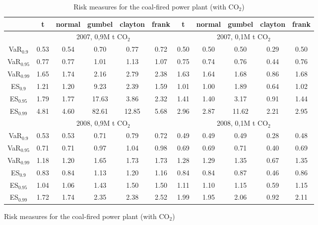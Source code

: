 \begin{figure}[htp]
{\tiny{}}
\begin{table}[!ht]
\centering{}{\tiny{}}%
\begin{tabular}{c|c|c|c|c|c|c|c|c|c|c}
 & {\tiny{t}} & {\tiny{normal}} & {\tiny{gumbel}} & {\tiny{clayton}} & {\tiny{frank}} & {\tiny{t}} & {\tiny{normal}} & {\tiny{gumbel}} & {\tiny{clayton}} & {\tiny{frank}}\tabularnewline
\hline 
 & \multicolumn{5}{c||}{{\tiny{2007, 0,9M t CO$_{2}$}}} & \multicolumn{5}{c}{{\tiny{2007, 0,1M t CO$_{2}$}}}\tabularnewline
\hline 
{\tiny{VaR$_{0.9}$}} & {\tiny{0.53}} & {\tiny{0.54}} & {\tiny{0.70}} & {\tiny{0.77}} & {\tiny{0.72}} & {\tiny{0.50}} & {\tiny{0.50}} & {\tiny{0.50}} & {\tiny{0.29}} & {\tiny{0.50}}\tabularnewline
{\tiny{VaR$_{0.95}$}} & {\tiny{0.77}} & {\tiny{0.77}} & {\tiny{1.01}} & {\tiny{1.13}} & {\tiny{1.07}} & {\tiny{0.75}} & {\tiny{0.74}} & {\tiny{0.76}} & {\tiny{0.44}} & {\tiny{0.76}}\tabularnewline
{\tiny{VaR$_{0.99}$}} & {\tiny{1.65}} & {\tiny{1.74}} & {\tiny{2.16}} & {\tiny{2.79}} & {\tiny{2.38}} & {\tiny{1.63}} & {\tiny{1.64}} & {\tiny{1.68}} & {\tiny{0.86}} & {\tiny{1.68}}\tabularnewline
{\tiny{ES$_{0.9}$}} & {\tiny{1.21}} & {\tiny{1.20}} & {\tiny{9.23}} & {\tiny{2.39}} & {\tiny{1.59}} & {\tiny{1.01}} & {\tiny{1.00}} & {\tiny{1.89}} & {\tiny{0.64}} & {\tiny{1.02}}\tabularnewline
{\tiny{ES$_{0.95}$}} & {\tiny{1.79}} & {\tiny{1.77}} & {\tiny{17.63}} & {\tiny{3.86}} & {\tiny{2.32}} & {\tiny{1.41}} & {\tiny{1.40}} & {\tiny{3.17}} & {\tiny{0.91}} & {\tiny{1.44}}\tabularnewline
{\tiny{ES$_{0.99}$}} & {\tiny{4.81}} & {\tiny{4.60}} & {\tiny{82.61}} & {\tiny{12.85}} & {\tiny{5.68}} & {\tiny{2.96}} & {\tiny{2.87}} & {\tiny{11.62}} & {\tiny{2.21}} & {\tiny{2.95}}\tabularnewline
\hline 
 & \multicolumn{5}{c||}{{\tiny{2008, 0,9M t CO$_{2}$}}} & \multicolumn{5}{c}{{\tiny{2008, 0,1M t CO$_{2}$}}}\tabularnewline
\hline 
{\tiny{VaR$_{0.9}$}} & {\tiny{0.53}} & {\tiny{0.53}} & {\tiny{0.71}} & {\tiny{0.79}} & {\tiny{0.72}} & {\tiny{0.49}} & {\tiny{0.49}} & {\tiny{0.49}} & {\tiny{0.28}} & {\tiny{0.48}}\tabularnewline
{\tiny{VaR$_{0.95}$}} & {\tiny{0.71}} & {\tiny{0.71}} & {\tiny{0.97}} & {\tiny{1.04}} & {\tiny{0.98}} & {\tiny{0.69}} & {\tiny{0.69}} & {\tiny{0.71}} & {\tiny{0.40}} & {\tiny{0.69}}\tabularnewline
{\tiny{VaR$_{0.99}$}} & {\tiny{1.18}} & {\tiny{1.20}} & {\tiny{1.65}} & {\tiny{1.73}} & {\tiny{1.73}} & {\tiny{1.28}} & {\tiny{1.29}} & {\tiny{1.35}} & {\tiny{0.67}} & {\tiny{1.35}}\tabularnewline
{\tiny{ES$_{0.9}$}} & {\tiny{0.83}} & {\tiny{0.84}} & {\tiny{1.13}} & {\tiny{1.20}} & {\tiny{1.16}} & {\tiny{0.84}} & {\tiny{0.84}} & {\tiny{0.87}} & {\tiny{0.46}} & {\tiny{0.86}}\tabularnewline
{\tiny{ES$_{0.95}$}} & {\tiny{1.04}} & {\tiny{1.06}} & {\tiny{1.43}} & {\tiny{1.50}} & {\tiny{1.50}} & {\tiny{1.11}} & {\tiny{1.10}} & {\tiny{1.15}} & {\tiny{0.59}} & {\tiny{1.15}}\tabularnewline
{\tiny{ES$_{0.99}$}} & {\tiny{1.72}} & {\tiny{1.74}} & {\tiny{2.35}} & {\tiny{2.38}} & {\tiny{2.52}} & {\tiny{1.99}} & {\tiny{1.95}} & {\tiny{2.06}} & {\tiny{0.92}} & {\tiny{2.11 }}\tabularnewline
\end{tabular}{\tiny{\caption{{\tiny{Risk measures for the coal-fired power plant (with CO$_{2}$)}}}
}}
\end{table}
{\tiny \par}


\end{figure}
